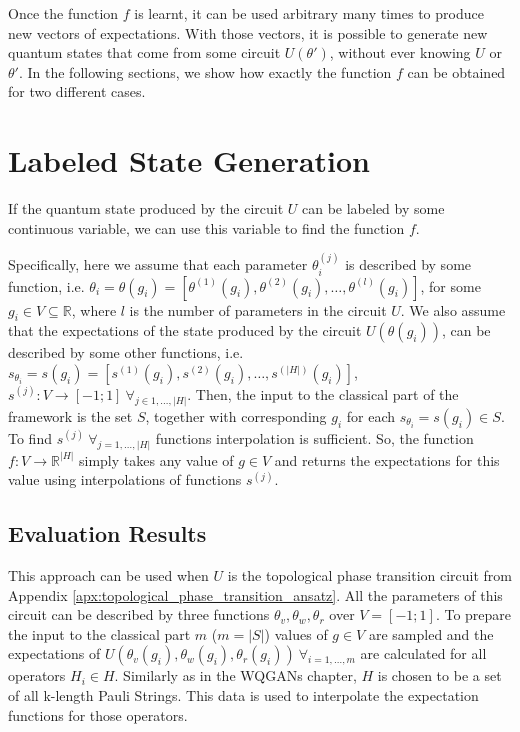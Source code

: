 Once the function $f$ is learnt, it can be used arbitrary many times to produce
new vectors of expectations.
With those vectors, it is possible to generate new quantum states that come from
some circuit $U(\theta')$, without ever knowing $U$ or $\theta'$.
In the following sections, we show how exactly the function $f$ can be obtained
for two different cases. 
\section{Labeled State Generation}
If the quantum state produced by the circuit $U$ can be labeled by some continuous
variable, we can use this variable to find the function $f$.

Specifically, here we assume that each parameter $\theta_i^{(j)}$ is described by some
function, i.e. $\theta_i = \theta(g_i) = [\theta^{(1)}(g_i), \theta^{(2)}(g_i), \ldots,
\theta^{(l)}(g_i)]$, for some $g_i \in V \subseteq 
\mathbb{R}$, where $l$ is the number of parameters in the circuit $U$.
We also assume that the expectations of the state produced by the
circuit $U(\theta(g_i))$, can be described by some other functions,
i.e. $s_{\theta_i} = s(g_i) = [s^{(1)}(g_i), s^{(2)}(g_i), \ldots,
s^{(|H|)}(g_i)]$, $s^{(j)}: V \to [-1; 1]\ \forall_{j \in 1,\ldots,|H|}$.
Then, the input to the classical part of the framework is the set $S$, together with
corresponding $g_i$ for each $s_{\theta_i} = s(g_i) \in S$.
To find $s^{(j)}\ \forall_{j=1,\ldots,|H|}$ functions interpolation is
sufficient. So, the function $f: V \to \mathbb{R}^{|H|}$ simply takes
any value of $g \in V$ and returns the expectations for this value using
interpolations of functions $s^{(j)}$.

\subsection{Evaluation Results}
This approach can be used when $U$ is the topological phase transition circuit from
Appendix \ref{apx:topological_phase_transition_ansatz}. All the parameters of
this circuit can be described by three functions $\theta_v, \theta_w, \theta_r$
over $V = [-1; 1]$. To prepare the input to the classical part 
 $m$ ($m = |S|$) values of $g \in V$ are sampled and the expectations of $U(\theta_v(g_i),
\theta_w(g_i), \theta_r(g_i))\ \forall_{i=1,\ldots,m}$ are calculated for all operators $H_i
\in H$. Similarly as in the WQGANs chapter, $H$ is chosen to be a
set of all k-length Pauli Strings.
This data is used to interpolate the expectation functions for those operators.  

